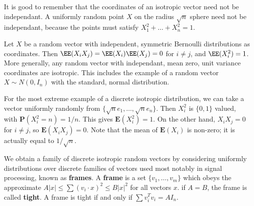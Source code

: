 It is good to remember that the coordinates of an isotropic vector need not be independant. A uniformly random point $X$ on the radius $\sqrt{n}$ sphere need not be independant, because the points must satisfy $X_1^2 + \dots + X_n^2 = 1$.

\begin{example}
    Let $X$ be a random vector with independent, symmetric Bernoulli distributions as coordinates. Then $\EE(X_iX_j) = \EE(X_i) \EE(X_j) = 0$ for $i \neq j$, and $\EE(X_i^2) = 1$. More generally, any random vector with independant, mean zero, unit variance coordinates are isotropic. This includes the example of a random vector $X \sim N(0,I_n)$ with the standard, normal distribution.
\end{example}

\begin{example}
    For the most extreme example of a discrete isotropic distribution, we can take a vector uniformly randomly from $\{ \sqrt{n} e_1, \dots, \sqrt{n} e_n \}$. Then $X_i^2$ is $\{ 0,1 \}$ valued, with $\mathbf{P}(X_i^2 = n) = 1/n$. This gives $\mathbf{E}(X_i^2) = 1$. On the other hand, $X_iX_j = 0$ for $i \neq j$, so $\mathbf{E}(X_iX_j) = 0$. Note that the mean of $\mathbf{E}(X_i)$ is non-zero; it is actually equal to $1/\sqrt{n}$.
\end{example}

We obtain a family of discrete isotropic random vectors by considering uniformly distributions over discrete families of vectors used most notably in signal processing, known as {\bf frames}. A {\bf frame} is a set $\{ v_1, \dots, v_m \}$ which obeys the approximate $A |x| \leq \sum (v_i \cdot x)^2 \leq B |x|^2$ for all vectors $x$. if $A = B$, the frame is called {\bf tight}. A frame is tight if and only if $\sum v_i^T v_i = A I_n$.


